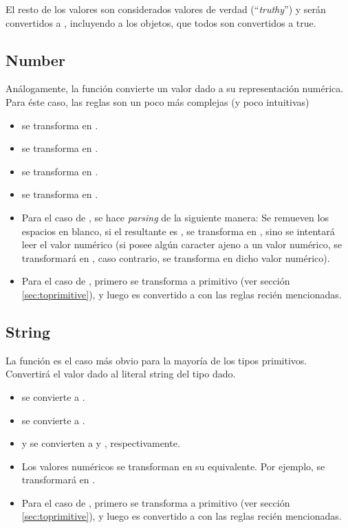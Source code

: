 El resto de los valores son considerados valores de verdad ("`\textit{truthy}"') y serán convertidos a , incluyendo a los objetos, que todos son convertidos a true.

\subsection{Number}

Análogamente, la función  convierte un valor dado a su representación numérica. Para éste caso, las reglas son un poco más complejas (y poco intuitivas)

\begin{itemize}
\item {} se transforma en .
\item {} se transforma en .
\item {} se transforma en .
\item {} se transforma en .
\item Para el caso de , se hace \textit{parsing} de la siguiente manera: Se remueven los espacios en blanco, si el  resultante es , se transforma en , sino se intentará leer el valor numérico (si posee algún caracter ajeno a un valor numérico, se transformará en , caso contrario, se transforma en dicho valor numérico).
\item Para el caso de , primero se transforma a primitivo (ver sección \ref{sec:toprimitive}), y luego es convertido a  con las reglas recién mencionadas.
\end{itemize}

\subsection{String}

La función  es el caso más obvio para la mayoría de los tipos primitivos. Convertirá el valor dado al literal string del tipo dado.

\begin{itemize}
\item {} se convierte a .
\item {} se convierte a .
\item {} y  se convierten a  y , respectivamente.
\item Los valores numéricos se transforman en su  equivalente. Por ejemplo,  se transformará en .
\item Para el caso de , primero se transforma a primitivo (ver sección \ref{sec:toprimitive}), y luego es convertido a  con las reglas recién mencionadas.
\end{itemize}

